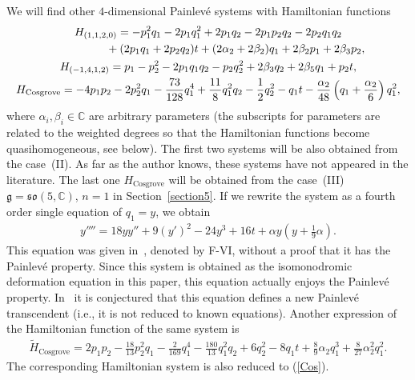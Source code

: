 \documentclass[10pt,a4paper]{amsart}
\numberwithin{equation}{section}
\begin{document}
We will f\/ind other $4$-dimensional Painlev\'{e} systems with Hamiltonian functions
\begin{gather}
H_{(1,1,2,0)} = -p_1^2q_1 - 2p_1q_1^2 + 2p_1q_2 - 2p_1p_2q_2 - 2p_2q_1q_2 \nonumber \\
\hphantom{H_{(1,1,2,0)} =}{} + (2p_1q_1 + 2p_2q_2)t + (2\alpha _2 + 2\beta_2 )q_1 + 2\beta_2 p_1 + 2\beta_3 p_2, \label{1120} \\
H_{(-1,4,1,2)} = p_1 - p_2^2 - 2p_1q_1q_2 - p_2q_2^2 + 2 \beta_3 q_2 + 2\beta_5 q_1 + p_2t, \label{-1412} \\
H_{\text{Cosgrove}} = -4p_1p_2 - 2p_2^2q_1 - \frac{73}{128}q_1^4 + \frac{11}{8}q_1^2q_2- \frac{1}{2}q_2^2 - q_1t - \frac{\alpha_2}{48}\left( q_1 + \frac{\alpha_2}{6} \right) q_1^2,\label{4dimCos}
\end{gather}
where $\alpha_i, \beta_i \in \mathbb{C}$ are arbitrary parameters (the subscripts for parameters are related to the weighted degrees so that the Hamiltonian functions become quasihomogeneous, see below). The f\/irst two systems will be also obtained from the case~(II). As far as the author knows, these systems have not appeared in the literature. The last one $H_{\text{Cosgrove}}$ will be obtained from the case~(III) $\mathfrak{g} = \mathfrak{so}(5, \mathbb{C})$, $n =1$ in Section~\ref{section5}. If we rewrite the system as a fourth order single equation of $q_1 = y$, we obtain
\begin{gather}
y'''' = 18 yy'' + 9(y')^2 - 24y^3 + 16t + \alpha y \left(y + \frac{1}{9}\alpha \right).\label{Cos}
\end{gather}
This equation was given in~\cite{Cos}, denoted by F-VI, without a proof that it has the Painlev\'{e} property. Since this system is obtained as the isomonodromic deformation equation in this paper, this equation actually enjoys the Painlev\'{e} property. In~\cite{Cos} it is conjectured that this equation def\/ines a new Painlev\'{e} transcendent (i.e., it is not reduced to known equations). Another expression of the Hamiltonian function of the same system is
\begin{gather}
\widetilde{H}_{\text{Cosgrove}} = 2p_1p_2 - \frac{18}{13}p_2^2q_1 - \frac{2}{169}q_1^4
 - \frac{180}{13}q_1^2q_2 + 6q_2^2 - 8q_1t + \frac{8}{9}\alpha _2q_1^3 + \frac{8}{27}\alpha _2^2q_1^2.\label{4dimCos2}
\end{gather}
The corresponding Hamiltonian system is also reduced to (\ref{Cos}).
\end{document}
